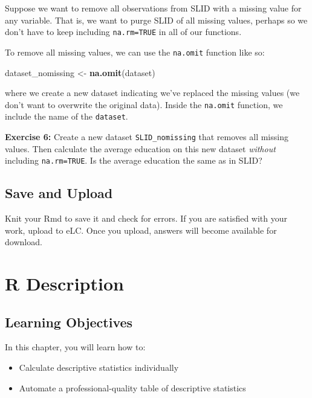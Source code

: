 \documentclass[
]{book}
\makeatletter
\newenvironment{Shaded}{\begin{snugshade}}{\end{snugshade}}
\newcommand{\FunctionTok}[1]{\textcolor[rgb]{0.27,0.27,0.27}{\textbf{#1}}}
\newcommand{\NormalTok}[1]{#1}
\newcommand{\OtherTok}[1]{\textcolor[rgb]{0.37,0.37,0.37}{#1}}
\providecommand{\tightlist}{%
  \setlength{\itemsep}{0pt}\setlength{\parskip}{0pt}}
\newenvironment{kframe}{%
\medskip{}
\setlength{\fboxsep}{.8em}
 \def\at@end@of@kframe{}%
 \ifinner\ifhmode%
  \def\at@end@of@kframe{\end{minipage}}%
  \begin{minipage}{\columnwidth}%
 \fi\fi%
 \def\FrameCommand##1{\hskip\@totalleftmargin \hskip-\fboxsep
 \colorbox{shadecolor}{##1}\hskip-\fboxsep
     \hskip-\linewidth \hskip-\@totalleftmargin \hskip\columnwidth}%
 \MakeFramed {\advance\hsize-\width
   \@totalleftmargin\z@ \linewidth\hsize
   \@setminipage}}%
 {\par\unskip\endMakeFramed%
 \at@end@of@kframe}
\renewenvironment{Shaded}{\begin{kframe}}{\end{kframe}}
\newenvironment{rmdblock}[1]
  {\begin{shaded*}
  }
  {\end{shaded*}
  }
\newenvironment{learncheck}
  {\begin{rmdblock}{warning}}
  {\end{rmdblock}}
\makeatother
\begin{document}
Suppose we want to remove all observations from SLID with a missing value for any variable. That is, we want to purge SLID of all missing values, perhaps so we don't have to keep including \texttt{na.rm=TRUE} in all of our functions.

To remove all missing values, we can use the \texttt{na.omit} function like so:

\begin{Shaded}
\begin{Highlighting}[]
\NormalTok{dataset\_nomissing }\OtherTok{\textless{}{-}} \FunctionTok{na.omit}\NormalTok{(dataset)}
\end{Highlighting}
\end{Shaded}

where we create a new dataset indicating we've replaced the missing values (we don't want to overwrite the original data). Inside the \texttt{na.omit} function, we include the name of the \texttt{dataset}.

\begin{learncheck}
\textbf{Exercise 6:} Create a new dataset \texttt{SLID\_nomissing} that
removes all missing values. Then calculate the average education on this
new dataset \emph{without} including \texttt{na.rm=TRUE}. Is the average
education the same as in SLID?
\end{learncheck}

\hypertarget{save-and-upload-2}{%
\section{Save and Upload}\label{save-and-upload-2}}

Knit your Rmd to save it and check for errors. If you are satisfied with your work, upload to eLC. Once you upload, answers will become available for download.

\hypertarget{r-description}{%
\chapter{R Description}\label{r-description}}

\hypertarget{learning-objectives-2}{%
\section{Learning Objectives}\label{learning-objectives-2}}

In this chapter, you will learn how to:

\begin{itemize}
\tightlist
\item
  Calculate descriptive statistics individually
\item
  Automate a professional-quality table of descriptive statistics
\end{itemize}
\end{document}
